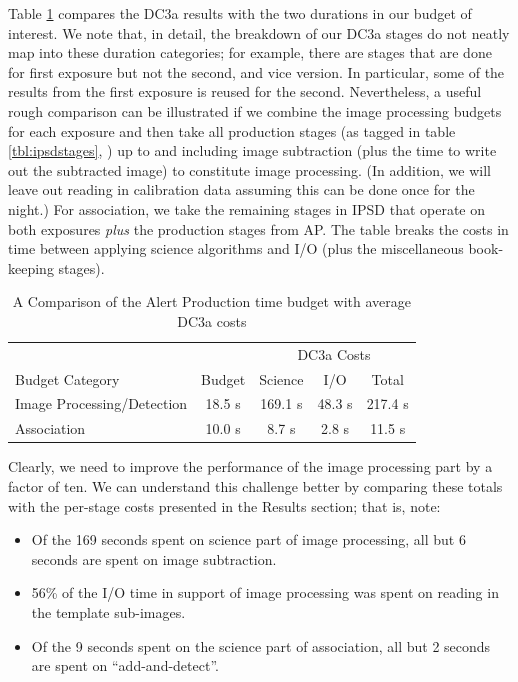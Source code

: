 Table \ref{tbl:budget} compares the DC3a results with the two
durations in our budget of interest.  We note that, in detail, the
breakdown of our DC3a stages do not neatly map into these duration
categories; for example, there are stages that are done for first
exposure but not the second, and vice version.  In particular, some of
the results from the first exposure is reused for the second.
Nevertheless, a useful rough comparison can be illustrated if we
combine the image processing budgets for each exposure and then take
all production stages (as tagged in table \ref{tbl:ipsdstages},
) up to and including image subtraction (plus the
time to write out the subtracted image) to constitute image
processing.  (In addition, we will leave out reading in calibration
data assuming this can be done once for the night.)  For association,
we take the remaining stages in IPSD that operate on both exposures
{\it plus} the production stages from AP.  The table breaks the costs
in time between applying science algorithms and I/O (plus the
miscellaneous book-keeping stages).

\begin{table}[htbp]
\centering
\caption{A Comparison of the Alert Production time budget with average
  DC3a costs 
\label{tbl:budget}}
\vspace{\baselineskip}
\begin{tabular}{lc|ccc}
\hline\hline
                           &        & \multicolumn{3}{c}{DC3a Costs}   \\
Budget Category            & Budget & Science    & I/O       & Total   \\
\hline
Image Processing/Detection & 18.5 s & 169.1 s    & 48.3 s    & 217.4 s \\
Association                & 10.0 s &   8.7 s    &  2.8 s    &  11.5 s \\
\hline
\end{tabular}
\end{table}

Clearly, we need to improve the performance of the image processing
part by a factor of ten.  We can understand this challenge better by
comparing these totals with the per-stage costs presented in the
Results section; that is, note:

\begin{itemize}
\item Of the 169 seconds spent on science part of image processing, all
  but 6 seconds are spent on image subtraction.
\item 56\% of the I/O time in support of image processing was spent on
  reading in the template sub-images. 
\item Of the 9 seconds spent on the science part of association, all
  but 2 seconds are spent on ``add-and-detect''.  
\end{itemize}


